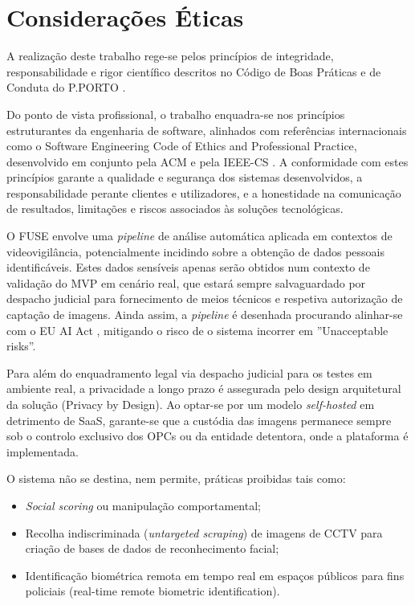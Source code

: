 \section{Considerações Éticas}
\label{sec:etica}

A realização deste trabalho rege-se pelos princípios de integridade, responsabilidade e rigor científico descritos no Código de Boas Práticas e de Conduta do P.PORTO \cite{PPORTO2020}.

Do ponto de vista profissional, o trabalho enquadra-se nos princípios estruturantes da engenharia de software, alinhados com referências internacionais como o Software Engineering Code of Ethics and Professional Practice, desenvolvido em conjunto pela \gls{ACM} e pela \gls{IEEE-CS} \cite{ACM_Ethics}. A conformidade com estes princípios garante a qualidade e segurança dos sistemas desenvolvidos, a responsabilidade perante clientes e utilizadores, e a honestidade na comunicação de resultados, limitações e riscos associados às soluções tecnológicas.

O \gls{FUSE} envolve uma \textit{pipeline} de análise automática aplicada em contextos de videovigilância, potencialmente incidindo sobre a obtenção de dados pessoais identificáveis. Estes dados sensíveis apenas serão obtidos num contexto de validação do \gls{MVP} em cenário real, que estará sempre salvaguardado por despacho judicial para fornecimento de meios técnicos e respetiva autorização de captação de imagens. Ainda assim, a \textit{pipeline} é desenhada procurando alinhar-se com o EU AI Act \cite{EU_AI_Act}, mitigando o risco de o sistema incorrer em ''Unacceptable risks''.

Para além do enquadramento legal via despacho judicial para os testes em ambiente real, a privacidade a longo prazo é assegurada pelo design arquitetural da solução (Privacy by Design). Ao optar-se por um modelo \textit{self-hosted} em detrimento de \gls{SaaS}, garante-se que a custódia das imagens permanece sempre sob o controlo exclusivo dos \glspl{OPC} ou da entidade detentora, onde a plataforma é implementada.

O sistema não se destina, nem permite, práticas proibidas tais como:

\begin{itemize}
    \item \textit{Social scoring} ou manipulação comportamental;
    \item Recolha indiscriminada (\textit{untargeted scraping}) de imagens de \gls{CCTV} para criação de bases de dados de reconhecimento facial;
    \item Identificação biométrica remota em tempo real em espaços públicos para fins policiais (real-time remote biometric identification).
\end{itemize}

